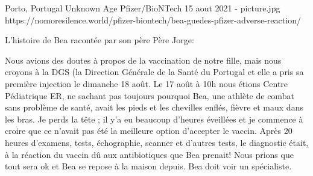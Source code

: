 {Porto, Portugal}
{Unknown Age}
{Pfizer/BioNTech}
{15 aout 2021}
{-}
{picture.jpg}
{https://nomoresilence.world/pfizer-biontech/bea-guedes-pfizer-adverse-reaction/}
{
L’histoire de Bea racontée par son père Père Jorge:

Nous avions des doutes à propos de la vaccination de notre fille, mais nous
croyons à la DGS (la Direction Générale de la Santé du Portugal et elle a pris
sa première injection le dimanche 18 août. Le 17 août à 10h nous étions Centre
Pédiatrique ER, ne sachant pas toujours pourquoi Bea, une athlète de combat sans
problème de santé, avait les pieds et les chevilles enflés, fièvre et maux dans
les bras. Je perds la tête ; il y’a eu beaucoup d’heures éveillées et je
commence à croire que ce n’avait pas été la meilleure option d’accepter le
vaccin. Après 20 heures d’examens, tests, échographie, scanner et d’autres
tests, le diagnostic était, à la réaction du vaccin dû aux antibiotiques que Bea
prenait! Nous prions que tout sera ok et Bea se repose à la maison depuis. Bea
doit voir un spécialiste.

}
